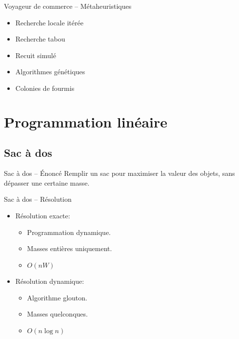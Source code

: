 \documentclass{beamer}
\begin{document}
\begin{frame}{Voyageur de commerce -- Métaheuristiques}
    \begin{itemize}
        \item Recherche locale itérée
        \item Recherche tabou
        \item Recuit simulé
        \item Algorithmes génétiques
        \item Colonies de fourmis
    \end{itemize}
\end{frame}

\section{Programmation linéaire}
\subsection{Sac à dos}
  \begin{frame}{Sac à dos -- Énoncé}
    Remplir un sac pour maximiser la valeur des objets, sans dépasser une
    certaine masse.
  \end{frame}

  \begin{frame}{Sac à dos -- Résolution}
    \begin{itemize}
      \item Résolution exacte:
      \begin{itemize}
        \item Programmation dynamique.
        \item Masses entières uniquement.
        \item $O(nW)$
      \end{itemize}

      \item Résolution dynamique:
      \begin{itemize}
        \item Algorithme glouton.
        \item Masses quelconques.
        \item $O(n \log n)$
      \end{itemize}
    \end{itemize}
  \end{frame}
\end{document}
